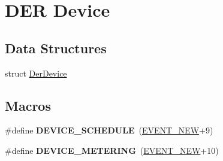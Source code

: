 \hypertarget{group__der}{}\section{D\+ER Device}
\label{group__der}
\subsection*{Data Structures}
\begin{DoxyCompactItemize}
\item 
struct \hyperlink{structDerDevice}{Der\+Device}
\end{DoxyCompactItemize}
\subsection*{Macros}
\begin{DoxyCompactItemize}
\item 
\mbox{\label{group__der_ga4ea6726b38ac5fa5cc0f3b5c9a4e6271}} 
\#define {\bfseries D\+E\+V\+I\+C\+E\+\_\+\+S\+C\+H\+E\+D\+U\+LE}~(\hyperlink{group__event_gga2628ea8d12e8b2563c32f05dc7fff6faa747b63b45296ad40109256f1a3c93bb7}{E\+V\+E\+N\+T\+\_\+\+N\+EW}+9)
\item 
\mbox{\label{group__der_ga2255813dedf7a6b9bdc4b0afd320022d}} 
\#define {\bfseries D\+E\+V\+I\+C\+E\+\_\+\+M\+E\+T\+E\+R\+I\+NG}~(\hyperlink{group__event_gga2628ea8d12e8b2563c32f05dc7fff6faa747b63b45296ad40109256f1a3c93bb7}{E\+V\+E\+N\+T\+\_\+\+N\+EW}+10)
\end{DoxyCompactItemize}
